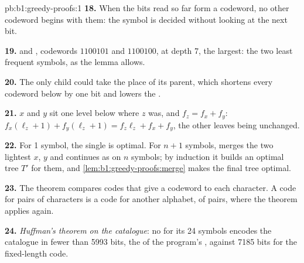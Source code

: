 \begin{solution}{pb:b1:greedy-proofs:1}
\textbf{18.} When the bits read so far form a codeword, no other codeword begins with them: the symbol is decided
without looking at the next bit.

\textbf{19.}  and , codewords $1100101$ and $1100100$, at depth 7, the largest: the two least frequent
symbols, as the lemma allows.

\textbf{20.} The only child could take the place of its parent, which shortens every codeword below by one bit and
lowers the .

\textbf{21.} $x$ and $y$ sit one level below where $z$ was, and $f_z = f_x + f_y$: $f_x(\ell_z + 1) + f_y(\ell_z + 1) =
f_z \ell_z + f_x + f_y$, the other leaves being unchanged.

\textbf{22.} For 1 symbol, the single  is optimal. For $n + 1$ symbols,  merges the two lightest
$x$, $y$ and continues as  on $n$ symbols; by induction it builds an optimal tree $T'$ for them, and
\cref{lem:b1:greedy-proofs:merge} makes the final tree optimal.

\textbf{23.} The theorem compares codes that give a codeword to each character. A code for pairs of characters is a code
for another alphabet, of pairs, where the theorem applies again.

\textbf{24.} \emph{Huffman's theorem on the catalogue}: no  for its 24 symbols encodes the catalogue in fewer
than 5993 bits, the  of the program's , against 7185 bits for the fixed-length code.
\end{solution}
